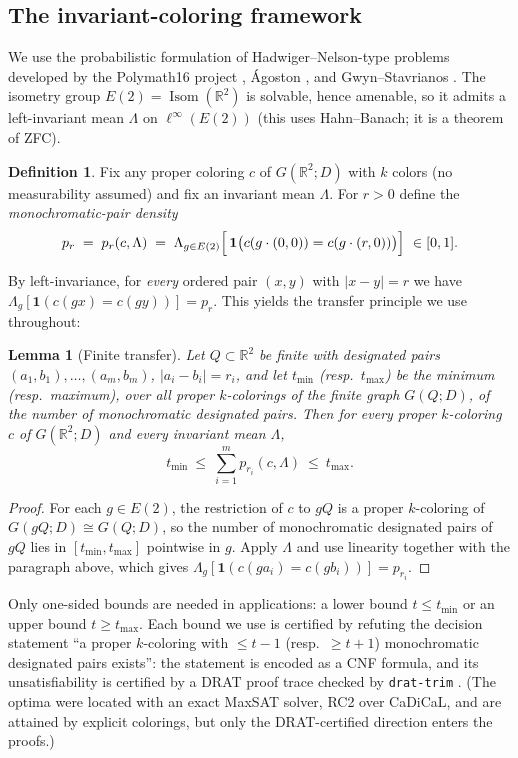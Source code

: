\documentclass[11pt]{article}
\newtheorem{lemma}[theorem]{Lemma}
\theoremstyle{definition}
\newtheorem{definition}[theorem]{Definition}
\theoremstyle{remark}
\newcommand{\R}{\mathbb{R}}
\DeclareMathOperator{\Iso}{Isom}
\begin{document}
\subsection{The invariant-coloring framework}\label{sec:framework}

We use the probabilistic formulation of Hadwiger--Nelson-type problems
developed by the Polymath16 project \cite{Polymath16}, \'Agoston
\cite{Agoston21}, and Gwyn--Stavrianos \cite{GwynStavrianos20}.  The
isometry group $E(2)=\Iso(\R^2)$ is solvable, hence amenable, so it
admits a left-invariant mean $\Lambda$ on $\ell^\infty(E(2))$ (this uses
Hahn--Banach; it is a theorem of ZFC).

\begin{definition}\label{def:pr}
Fix any proper coloring $c$ of $G(\R^2;D)$ with $k$ colors (no
measurability assumed) and fix an invariant mean $\Lambda$.  For $r>0$
define the \emph{monochromatic-pair density}
\[
  p_r \;=\; p_r(c,\Lambda)\;=\;
  \Lambda_{g\in E(2)}\Bigl[\,\mathbf 1\bigl(c(g\cdot(0,0))=c(g\cdot(r,0))\bigr)\Bigr]
  \ \in[0,1].
\]
\end{definition}

By left-invariance, for \emph{every} ordered pair $(x,y)$ with $|x-y|=r$
we have $\Lambda_g[\mathbf 1(c(gx)=c(gy))]=p_r$.  This yields the
transfer principle we use throughout:

\begin{lemma}[Finite transfer]\label{lem:transfer}
Let $Q\subset\R^2$ be finite with designated pairs
$(a_1,b_1),\dots,(a_m,b_m)$, $|a_i-b_i|=r_i$, and let $t_{\min}$
(resp.\ $t_{\max}$) be the minimum (resp.\ maximum), over all proper
$k$-colorings of the finite graph $G(Q;D)$, of the number of
monochromatic designated pairs.  Then for every proper $k$-coloring $c$
of $G(\R^2;D)$ and every invariant mean $\Lambda$,
\[
  t_{\min}\ \le\ \sum_{i=1}^{m} p_{r_i}(c,\Lambda)\ \le\ t_{\max}.
\]
\end{lemma}

\begin{proof}
For each $g\in E(2)$, the restriction of $c$ to $gQ$ is a proper
$k$-coloring of $G(gQ;D)\cong G(Q;D)$, so the number of monochromatic
designated pairs of $gQ$ lies in $[t_{\min},t_{\max}]$ pointwise in $g$.
Apply $\Lambda$ and use linearity together with the paragraph above,
which gives $\Lambda_g[\mathbf 1(c(ga_i)=c(gb_i))]=p_{r_i}$.
\end{proof}

Only one-sided bounds are needed in applications: a lower bound
$t\le t_{\min}$ or an upper bound $t\ge t_{\max}$.  Each bound we use is
certified by refuting the decision statement ``a proper $k$-coloring
with $\le t-1$ (resp.\ $\ge t+1$) monochromatic designated pairs
exists'': the statement is encoded as a CNF formula, and its
unsatisfiability is certified by a DRAT proof trace checked by
\texttt{drat-trim} \cite{drattrim}.  (The optima were located with an
exact MaxSAT solver, RC2 over CaDiCaL, and are attained by explicit
colorings, but only the DRAT-certified direction enters the proofs.)
\end{document}
